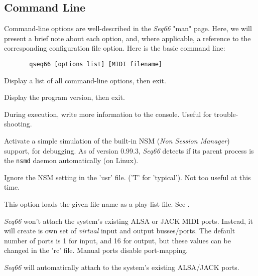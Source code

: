 \subsection{Command Line}
\label{subsec:configuration_command_line}

   Command-line options are well-described in the \textsl{Seq66} "man" page.
   Here, we will present a brief note about each option, and, where applicable,
   a reference to the corresponding configuration file option.
   Here is the basic command line:

   \begin{verbatim}
       qseq66 [options list] [MIDI filename]
   \end{verbatim}

      Display a list of all command-line options, then exit.

      Display the program version, then exit.

      During execution, write more information to the console.  Useful for
      trouble-shooting.
   
      Activate a simple simulation of the built-in NSM
      (\textsl{Non Session Manager}) support, for debugging.
      As of version 0.99.3, \textsl{Seq66} detects if its parent process
      is the \texttt{nsmd} daemon automatically (on Linux).

      Ignore the NSM setting in the 'usr' file. ('T' for 'typical').
      Not too useful at this time.

      This option loads the given file-name as a play-list file.
      See .



      \textsl{Seq66} won't attach the system's existing ALSA or JACK MIDI ports.
      Instead, it will create is own set of \textsl{virtual}
      input and output busses/ports.  The default number of ports is 1 for input,
      and 16 for output, but these values can be changed in the 'rc' file.
      Manual ports disable port-mapping.


      \textsl{Seq66} will automatically attach to the system's existing
      ALSA/JACK ports.

